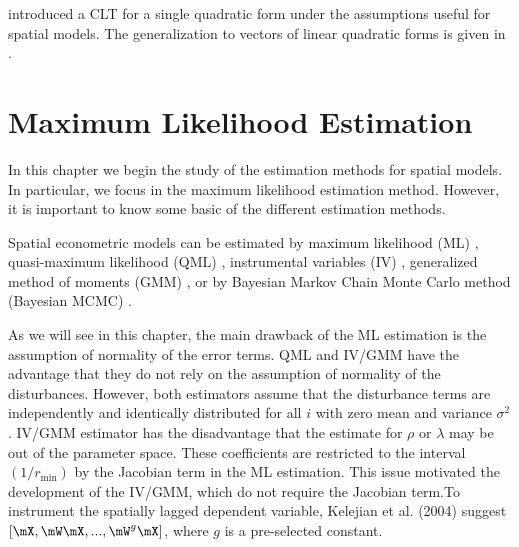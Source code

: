 \documentclass[english,12pt]{book}\usepackage[]{graphicx}\usepackage[]{xcolor}
\begin{document}
\cite{kelejian2001asymptotic} introduced a CLT for a single quadratic form under the assumptions useful for spatial models. The generalization to vectors of linear quadratic forms is given in \cite{kelejian2010specification}.


\chapter{Maximum Likelihood Estimation}\label{chap:ML}

In this chapter we begin the study of the estimation methods for spatial models. In particular, we focus in the maximum likelihood estimation method. However, it is important to know some basic of the different estimation methods. 

Spatial econometric models can be estimated by maximum likelihood (ML) \citep{ord1975estimation}, quasi-maximum likelihood (QML) \citep{lee2004asymptotic}, instrumental variables (IV) \citep[][pp. 82-86]{anselin1988spatial}, generalized method of moments (GMM) \citep{kelejian1998generalized, kelejian1999generalized}, or by Bayesian Markov Chain Monte Carlo method (Bayesian MCMC) \citep{lesage1997bayesian}.

As we will see in this chapter, the main drawback of the ML estimation is the assumption of normality of the error terms. QML and IV/GMM have the advantage that they do not rely on the assumption of normality of the disturbances. However, both estimators assume that the disturbance terms are independently and identically distributed for all $i$ with zero mean and variance $\sigma^2$.  IV/GMM estimator has the disadvantage that the estimate for $\rho$ or $\lambda$ may be out of the parameter space. These coefficients are restricted to the interval $(1/r_{\mbox{min}})$ by the Jacobian term in the ML estimation. This issue motivated the development of the IV/GMM, which do not require the Jacobian term.To instrument the spatially lagged dependent variable, Kelejian et al. (2004) suggest $\left[\mX, \mW\mX,...,\mW^g\mX\right]$, where $g$ is a pre-selected constant. 



\end{document}
